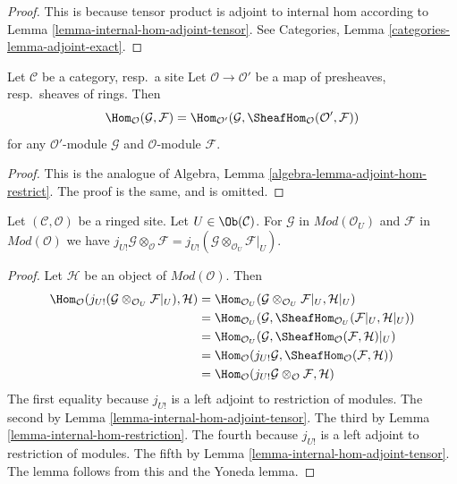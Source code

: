 \begin{proof}
This is because tensor product is adjoint to internal hom according
to Lemma \ref{lemma-internal-hom-adjoint-tensor}.
See Categories, Lemma \ref{categories-lemma-adjoint-exact}.
\end{proof}

\begin{lemma}
\label{lemma-adjoint-hom-restrict}
Let $\mathcal{C}$ be a category, resp.\ a site
Let $\mathcal{O} \to \mathcal{O}'$ be a map of presheaves, resp.\ sheaves
of rings. Then
$$
\Hom_\mathcal{O}(\mathcal{G}, \mathcal{F}) =
\Hom_{\mathcal{O}'}(\mathcal{G},
\SheafHom_\mathcal{O}(\mathcal{O}', \mathcal{F}))
$$
for any $\mathcal{O}'$-module $\mathcal{G}$ and $\mathcal{O}$-module
$\mathcal{F}$.
\end{lemma}

\begin{proof}
This is the analogue of
Algebra, Lemma \ref{algebra-lemma-adjoint-hom-restrict}.
The proof is the same, and is omitted.
\end{proof}

\begin{lemma}
\label{lemma-j-shriek-and-tensor}
Let $(\mathcal{C}, \mathcal{O})$ be a ringed site.
Let $U \in \Ob(\mathcal{C})$.
For $\mathcal{G}$ in $\textit{Mod}(\mathcal{O}_U)$
and $\mathcal{F}$ in $\textit{Mod}(\mathcal{O})$
we have $j_{U!}\mathcal{G} \otimes_\mathcal{O} \mathcal{F} =
j_{U!}(\mathcal{G} \otimes_{\mathcal{O}_U} \mathcal{F}|_U)$.
\end{lemma}

\begin{proof}
Let $\mathcal{H}$ be an object of $\textit{Mod}(\mathcal{O})$.
Then
\begin{align*}
\Hom_\mathcal{O}(j_{U!}(\mathcal{G} \otimes_{\mathcal{O}_U} \mathcal{F}|_U),
\mathcal{H})
& =
\Hom_{\mathcal{O}_U}(\mathcal{G} \otimes_{\mathcal{O}_U} \mathcal{F}|_U,
\mathcal{H}|_U) \\
& =
\Hom_{\mathcal{O}_U}(\mathcal{G},
\SheafHom_{\mathcal{O}_U}(\mathcal{F}|_U, \mathcal{H}|_U)) \\
& =
\Hom_{\mathcal{O}_U}(\mathcal{G},
\SheafHom_\mathcal{O}(\mathcal{F}, \mathcal{H})|_U) \\
& =
\Hom_\mathcal{O}(j_{U!}\mathcal{G},
\SheafHom_\mathcal{O}(\mathcal{F}, \mathcal{H})) \\
& =
\Hom_\mathcal{O}(j_{U!}\mathcal{G} \otimes_\mathcal{O} \mathcal{F},
\mathcal{H})
\end{align*}
The first equality because $j_{U!}$ is a left adjoint to restriction
of modules.
The second by Lemma \ref{lemma-internal-hom-adjoint-tensor}.
The third by Lemma \ref{lemma-internal-hom-restriction}.
The fourth because $j_{U!}$ is a left adjoint to restriction
of modules.
The fifth by Lemma \ref{lemma-internal-hom-adjoint-tensor}.
The lemma follows from this and the Yoneda lemma.
\end{proof}

